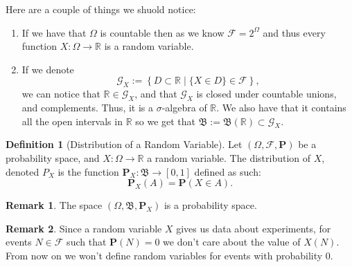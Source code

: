 \documentclass[11pt,a4paper]{article}
\theoremstyle{definition}
\newtheorem{definition}{Definition}[section]
\newtheorem{remark}{Remark}[section]
\theoremstyle{plain}
\newcommand{\R}{\mathbb{R}}
\newcommand{\Prob}{\mathbf{P}}
\newcommand{\set}[2]{ \left\{ #1 \mid #2 \right\} }
\begin{document}
  Here are a couple of things we shuold notice:
  \begin{enumerate}
    \item If we have that $\Omega$ is countable then as we know 
    $\mathcal F = 2^\Omega$ and thus every function $X \colon \Omega \to \R$
    is a random variable.
    \item If we denote 
    \[
      \mathcal G_X := \set{D \subset \R}{\{X \in D\} \in \mathcal F},
    \]
    we can notice that $\R \in \mathcal G_X$, and that $\mathcal G_X$ is
    closed under countable unions, and complements. 
    Thus, it is a $\sigma$-algebra of $\R$.
    We also have that it contains all the open intervals in $\R$ so we
    get that $\mathfrak B := \mathfrak B(\R) \subset \mathcal G_X$.
  \end{enumerate}
  
  \begin{definition}[Distribution of a Random Variable]
    Let $(\Omega, \mathcal F, \Prob)$ be a probability space, and 
    $X \colon \Omega \to \R$ a random variable.
    The distribution of $X$, denoted $P_X$ is the function 
    $\Prob_X \colon \mathfrak B \to [0,1]$ defined as such:
    \[
      \Prob_X(A) = \Prob(X \in A).
    \]
  \end{definition}
  \begin{remark}
    The space $(\Omega, \mathfrak B, \Prob_X)$ is a probability space.
  \end{remark}
  \begin{remark}
    Since a random variable $X$ gives us data about experiments, for events
    $N \in \mathcal F$ such that $\Prob(N) = 0$ we don't care about the
    value of $X(N)$. From now on we won't define random variables for events
    with probability $0$.
  \end{remark}
  
\end{document}
